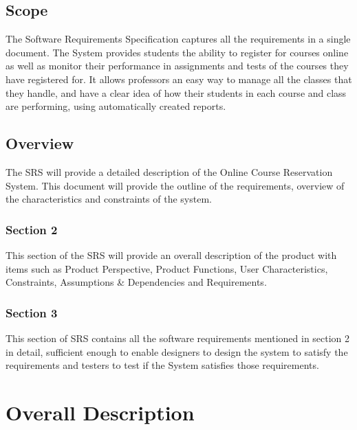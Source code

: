\documentclass[12pt, a4]{article}
\begin{document}

\subsection{Scope}
The Software Requirements Specification captures all the requirements in a single document. The System provides students the ability to register for courses online as well as monitor their performance in assignments and tests of the courses they have registered for. It allows professors an easy way to manage all the classes that they handle, and have a clear idea of how their students in each course and class are performing, using automatically created reports.


\subsection{Overview}
The SRS will provide a detailed description of the Online Course Reservation System. This document will provide the outline of the requirements, overview of the characteristics and constraints of the system.\\
\subsubsection{Section 2} This section of the SRS will provide an overall description of the product with items such as Product Perspective, Product Functions, User Characteristics, Constraints, Assumptions \& Dependencies and Requirements.
\subsubsection{Section 3} This section of SRS contains all the software requirements mentioned in section 2 in detail, sufficient enough to enable designers to design the system to satisfy the requirements and testers to test if the System satisfies those requirements. 


\section{Overall Description}
\end{document}
